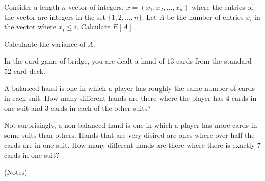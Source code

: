 \documentclass[12pt,oneside]{article}
\begin{document}
\newpage


\begin{problem}{10}

Consider a length $n$ vector of integers, $x = (x_1, x_2, \ldots, x_n)$ where the entries
of the vector are integers in the set $\{1, 2, \ldots, n \}$.  Let $A$ be the number of 
entries $x_i$ in the vector where $x_i \leq i$.  
\bparts
		Calculate $E[A]$.
		
		\vspace{4 in}
		
		Calculaate the variance of $A$.
		
		\vspace{4 in}
\eparts


\end{problem}

\newpage
\begin{problem}{20}
In the card game of bridge, you are dealt a hand of $13$ cards from the standard $52$-card deck.
\bparts

A balanced hand is one in which a player has roughly the same number of cards in each suit. How many different hands are there where the player has $4$ cards in one suit and $3$ cards in each of the other suits?
\vspace{4 in}

Not surprisingly, a non-balanced hand is one in which a player has more cards in some suits than others. Hands that are very disired are ones where over half the cards are in one suit. How many different hands are there where there is exactly $7$ cards in one suit?
\eparts
\end{problem}


\newpage

\newpage
\begin{center}
(Notes)
\end{center}

\newpage

\mbox{}

\newpage

\mbox{}
\end{document}
